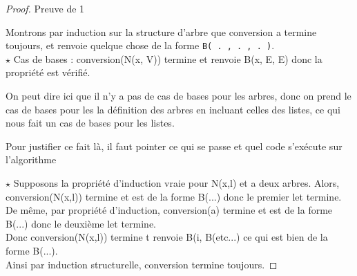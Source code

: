\begin{proof}Preuve de 1
	
	Montrons par induction sur la structure d'arbre que conversion a termine toujours, et renvoie quelque chose de la forme \lstinline|B( . , . , . )|.\\
	
	$\star$ Cas de bases : conversion(N(x, V)) termine et renvoie B(x, E, E) donc la propriété est vérifié.
	\begin{com}
		On peut dire ici que il n'y a pas de cas de bases pour les arbres, donc on prend le cas de bases pour les la définition des arbres en incluant celles des listes, ce qui nous fait un cas de bases pour les listes.
	\end{com}
	
	\begin{com}
		Pour justifier ce fait là, il faut pointer ce qui se passe et quel code s'exécute sur l'algorithme
	\end{com}

	$\star$ Supposons la propriété d'induction vraie pour N(x,l) et a deux arbres.
	Alors, conversion(N(x,l)) termine et est de la forme B(...) donc le premier let termine.\\
	De même, par propriété d'induction, conversion(a) termine et est de la forme B(...) donc le deuxième let termine.\\
	Donc conversion(N(x,l)) termine t renvoie B(i, B(etc...) ce qui est bien de la forme B(...).\\
	
	Ainsi par induction structurelle, conversion termine toujours.

\end{proof}


